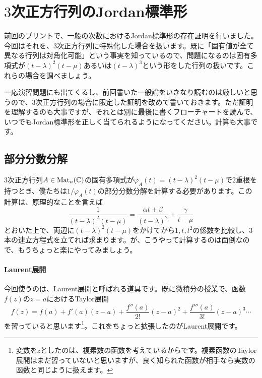 \section{$3$次正方行列のJordan標準形}

前回のプリントで、一般の次数におけるJordan標準形の存在証明を行いました。今回はそれを、$3$次正方行列に特殊化した場合を扱います。既に「固有値が全て異なる行列は対角化可能」という事実を知っているので、問題になるのは固有多項式が$(t - \lambda)^2 (t - \mu)$あるいは$(t - \lambda)^3$という形をした行列の扱いです。これらの場合を調べましょう。

一応演習問題にも出てくるし、前回書いた一般論をいきなり読むのは厳しいと思うので、$3$次正方行列の場合に限定した証明を改めて書いておきます。ただ証明を理解するのも大事ですが、それとは別に最後に書くフローチャートを読んで、いつでもJordan標準形を正しく当てられるようになってください。計算も大事です。

\subsection{部分分数分解}

$3$次正方行列$A \in \operatorname{Mat}_n(\mathbb{C})$の固有多項式が$\varphi_A(t) = (t - \lambda)^2 (t - \mu)$で$2$重根を持つとき、僕たちは$1/\varphi_A(t)$の部分分数分解を計算する必要があります。この計算は、原理的なことを言えば
\[
\frac{1}{(t - \lambda)^2 (t - \mu)} = \frac{\alpha t + \beta}{(t - \lambda)^2} + \frac{\gamma}{t - \mu}
\]
とおいた上で、両辺に$(t - \lambda)^2 (t - \mu)$をかけてから$1, t, t^2$の係数を比較し、$3$本の連立方程式を立てれば求まります。が、こうやって計算するのは面倒なので、もうちょっと楽にやってみましょう。

\paragraph{Laurent展開}

今回使うのは、Laurent展開と呼ばれる道具です。既に微積分の授業で、函数$f(z)$の$z = a$におけるTaylor展開
\[
f(z) = f(a) + f'(a) (z - a) + \frac{f''(a)}{2!} (z - a)^2 + \frac{f'''(a)}{3!}(z - a)^3 \cdots
\]
を習っていると思います\footnote{変数を$z$としたのは、複素数の函数を考えているからです。複素函数のTaylor展開はまだ習っていないと思いますが、良く知られた函数が相手なら実数の函数と同じように扱えます。}。これをちょっと拡張したのがLaurent展開です。

